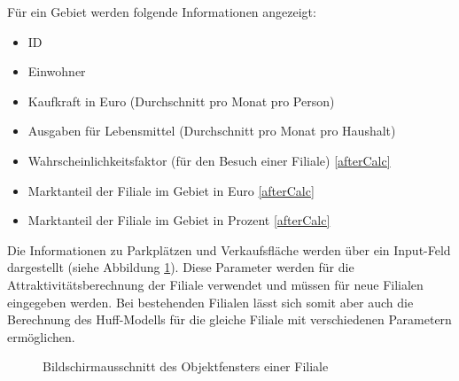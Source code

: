 Für ein Gebiet werden folgende Informationen angezeigt:

\begin{itemize}
	\item ID
	\item Einwohner
	\item Kaufkraft in Euro (Durchschnitt pro Monat pro Person)
	\item Ausgaben für Lebensmittel (Durchschnitt pro Monat pro Haushalt) 
	\item Wahrscheinlichkeitsfaktor (für den Besuch einer Filiale) \cref{afterCalc}
	\item Marktanteil der Filiale im Gebiet in Euro \cref{afterCalc}
	\item Marktanteil der Filiale im Gebiet in Prozent \cref{afterCalc}
\end{itemize}

Die Informationen zu Parkplätzen und Verkaufsfläche werden über ein Input-Feld dargestellt (siehe Abbildung \ref{img:filiale}).
Diese Parameter werden für die Attraktivitätsberechnung der Filiale verwendet und müssen für neue Filialen eingegeben werden.
Bei bestehenden Filialen lässt sich somit aber auch die Berechnung des Huff-Modells für die gleiche Filiale mit verschiedenen Parametern ermöglichen.

\begin{figure}[H]
	\caption{Bildschirmausschnitt des Objektfensters einer Filiale}
	\label{img:filiale}
\end{figure}

